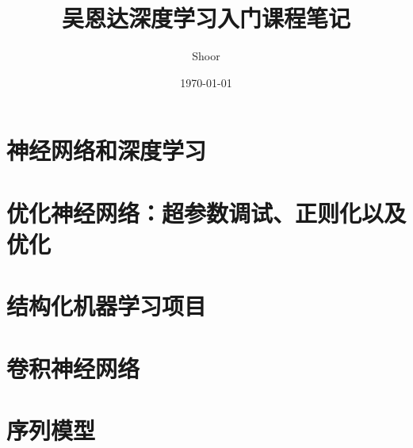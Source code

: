 \documentclass{book}
\title{吴恩达深度学习入门课程笔记}
\author{Shoor}
\date{\today}
\begin{document}
\maketitle
\tableofcontents
\part{神经网络和深度学习}





\part{优化神经网络：超参数调试、正则化以及优化}




\part{结构化机器学习项目}



\part{卷积神经网络}


% 
% 

\part{序列模型}
% 
% 
% 

\printbibliography
\printindex
\end{document}
